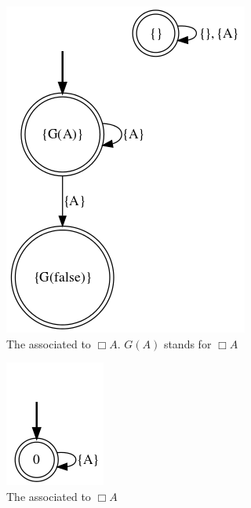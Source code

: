 \begin{example}
	\begin{figure}[h!]
		\centering
		\caption{The \NFA associated to $\Box A$.  $G(A)$ stands for $\Box A$}\label{fig:nfa-always-a}
		\includegraphics[width=.4\linewidth]{images/ltlf-alwaysA-nfa}
	\end{figure}
	\begin{figure}[h!]
		\centering
		\caption{The \DFA associated to $\Box A$}\label{fig:dfa-always-a}
		\includegraphics[width=.2\linewidth]{images/ltlf-alwaysA-dfa}
	\end{figure}

	
\end{example}
